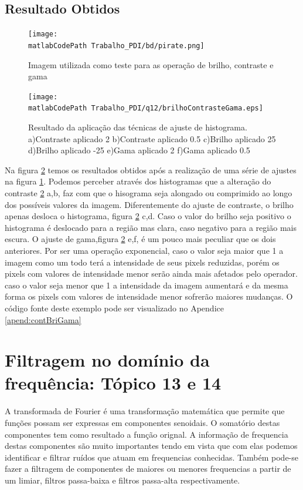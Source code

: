 \documentclass[
	article,			%
	11pt,				%
	oneside,			%
	a4paper,			%
	english,			%
	brazil,				%
	sumario=tradicional
	]{abntex2}
\newcommand{\matlabCodePath}{/home/clifte/git/Mestrado/Matlab/}
\begin{document}
\subsection{Resultado Obtidos}

\begin{figure} 
		\centering
		\texttt{[image: \\matlabCodePath
		Trabalho\_PDI/bd/pirate.png]}
		\caption{Imagem utilizada como teste para as operação de brilho, contraste e
		gama}
		\label{fig:BrilhoContGamaOriginal}
\end{figure}

\begin{figure} 
		\centering 
		\texttt{[image: \\matlabCodePath
		Trabalho\_PDI/q12/brilhoContrasteGama.eps]}
		\caption{Resultado da aplicação das técnicas de ajuste de histograma.
		a)Contraste aplicado 2
		b)Contraste aplicado 0.5
		c)Brilho aplicado 25
		d)Brilho aplicado -25
		e)Gama aplicado 2
		f)Gama aplicado 0.5 
		}
		\label{fig:brilhContGamaRes}		
\end{figure}

Na figura \ref{fig:brilhContGamaRes} temos os resultados obtidos após a
realização de uma série de ajustes na figura \ref{fig:BrilhoContGamaOriginal}.
Podemos perceber através dos histogramas que a alteração do contraste
\ref{fig:brilhContGamaRes} a,b,  faz com que o hisograma seja alongado ou
comprimido ao longo dos possíveis valores da imagem. Diferentemente do ajuste
de contraste, o brilho apenas desloca o histograma,
figura \ref{fig:brilhContGamaRes} c,d. Caso o valor do brilho seja positivo o
histograma é deslocado para a região mas clara, caso negativo para a região mais
escura. O ajuste de gama,figura \ref{fig:brilhContGamaRes} e,f, é um pouco mais
peculiar que os dois anteriores. Por ser uma operação exponencial, caso o valor seja maior que 1 a imagem como um
todo terá a intensidade de seus pixels reduzidas, porém os pixels com valores de
intensidade menor serão ainda mais afetados pelo operador. caso o valor seja
menor que 1 a intensidade da imagem aumentará e da mesma forma os pixels com
valores de intensidade menor sofrerão maiores mudanças. O código fonte deste
exemplo pode ser visualizado no Apendice \ref{apend:contBriGama}


\section{Filtragem no domínio da frequência: Tópico 13 e 14}
A transformada de Fourier é uma transformação matemática que permite que funções
possam ser expressas em componentes senoidais. O somatório destas componentes
tem como resultado a função orignal. A informação de frequencia destas
componentes são muito importantes tendo em vista que com elas podemos
identificar e filtrar ruídos que atuam em frequencias conhecidas. Também pode-se
fazer a filtragem de componentes de maiores ou menores frequencias a partir de
um limiar, filtros passa-baixa e filtros passa-alta respectivamente.
\end{document}

